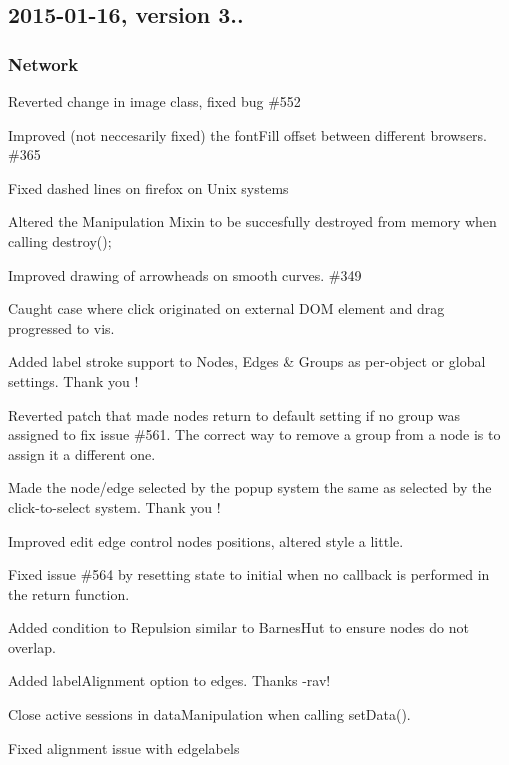 \subsection*{2015-\/01-\/16, version 3..}

\subsubsection*{Network}


\begin{DoxyItemize}
\item Reverted change in image class, fixed bug \#552
\item Improved (not neccesarily fixed) the font\+Fill offset between different browsers. \#365
\item Fixed dashed lines on firefox on Unix systems
\item Altered the Manipulation Mixin to be succesfully destroyed from memory when calling destroy();
\item Improved drawing of arrowheads on smooth curves. \#349
\item Caught case where click originated on external D\+OM element and drag progressed to vis.
\item Added label stroke support to Nodes, Edges \& Groups as per-\/object or global settings. Thank you !
\item Reverted patch that made nodes return to \textquotesingle{}default\textquotesingle{} setting if no group was assigned to fix issue \#561. The correct way to \textquotesingle{}remove\textquotesingle{} a group from a node is to assign it a different one.
\item Made the node/edge selected by the popup system the same as selected by the click-\/to-\/select system. Thank you !
\item Improved edit edge control nodes positions, altered style a little.
\item Fixed issue \#564 by resetting state to initial when no callback is performed in the return function.
\item Added condition to Repulsion similar to Barnes\+Hut to ensure nodes do not overlap.
\item Added label\+Alignment option to edges. Thanks -\/rav!
\item Close active sessions in data\+Manipulation when calling set\+Data().
\item Fixed alignment issue with edgelabels
\end{DoxyItemize}

